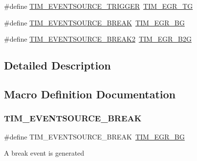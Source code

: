 \begin{DoxyCompactItemize}
\item 
\#define \mbox{\hyperlink{group___t_i_m___event___source_ga85573ed76442490db67e4b759fe6d901}{T\+I\+M\+\_\+\+E\+V\+E\+N\+T\+S\+O\+U\+R\+C\+E\+\_\+\+T\+R\+I\+G\+G\+ER}}~\mbox{\hyperlink{group___peripheral___registers___bits___definition_ga2eabface433d6adaa2dee3df49852585}{T\+I\+M\+\_\+\+E\+G\+R\+\_\+\+TG}}
\item 
\#define \mbox{\hyperlink{group___t_i_m___event___source_ga83d16368fe3172a98c41d7c414780a64}{T\+I\+M\+\_\+\+E\+V\+E\+N\+T\+S\+O\+U\+R\+C\+E\+\_\+\+B\+R\+E\+AK}}~\mbox{\hyperlink{group___peripheral___registers___bits___definition_ga08c5635a0ac0ce5618485319a4fa0f18}{T\+I\+M\+\_\+\+E\+G\+R\+\_\+\+BG}}
\item 
\#define \mbox{\hyperlink{group___t_i_m___event___source_ga1fc597b9937cc1cbc09b0e4450ad55fc}{T\+I\+M\+\_\+\+E\+V\+E\+N\+T\+S\+O\+U\+R\+C\+E\+\_\+\+B\+R\+E\+A\+K2}}~\mbox{\hyperlink{group___peripheral___registers___bits___definition_ga42a7335ccbf7565d45b3efd51c213af2}{T\+I\+M\+\_\+\+E\+G\+R\+\_\+\+B2G}}
\end{DoxyCompactItemize}


\subsection{Detailed Description}


\subsection{Macro Definition Documentation}
\mbox{\label{group___t_i_m___event___source_ga83d16368fe3172a98c41d7c414780a64}} 
\subsubsection{\texorpdfstring{TIM\_EVENTSOURCE\_BREAK}{TIM\_EVENTSOURCE\_BREAK}}
{\footnotesize\ttfamily \#define T\+I\+M\+\_\+\+E\+V\+E\+N\+T\+S\+O\+U\+R\+C\+E\+\_\+\+B\+R\+E\+AK~\mbox{\hyperlink{group___peripheral___registers___bits___definition_ga08c5635a0ac0ce5618485319a4fa0f18}{T\+I\+M\+\_\+\+E\+G\+R\+\_\+\+BG}}}

A break event is generated \mbox{\label{group___t_i_m___event___source_ga1fc597b9937cc1cbc09b0e4450ad55fc}} 

